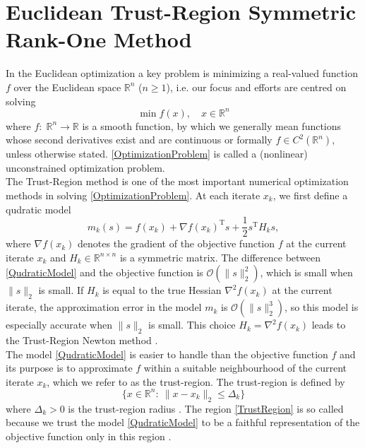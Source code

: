 \chapter{Euclidean Trust-Region Symmetric Rank-One Method}

In the Euclidean optimization a key problem is minimizing a real-valued function $f$ over the Euclidean space $\mathbb{R}^n$ ($n \geq 1$), i.e. our focus and efforts are centred on solving 
\begin{equation}\label{OptimizationProblem}
    \min f(x), \quad x \in \mathbb{R}^n
\end{equation}  
where $f \colon \; \mathbb{R}^n \to \mathbb{R}$ is a smooth function, by which we generally mean functions whose second derivatives exist and are continuous or formally $f \in C^2(\mathbb{R}^n)$, unless otherwise stated. \cref{OptimizationProblem} is called a (nonlinear) unconstrained optimization problem. \\
The Trust-Region method is one of the most important numerical optimization methods in solving \cref{OptimizationProblem}. At each iterate $x_k$, we first define a qudratic model 
\begin{equation}\label{QudraticModel}
    m_k(s) = f(x_k) + \nabla f(x_k)^{\mathrm{T}} s + \frac{1}{2} s^{\mathrm{T}} H_k s,
\end{equation}
where $\nabla f(x_k)$ denotes the gradient of the objective function $f$ at the current iterate $x_k$ and $H_k \in  \mathbb{R}^{n \times n}$ is a symmetric matrix. The difference between \cref{QudraticModel} and the objective function is $\mathcal{O}(\lVert s \rVert^{2}_2)$, which is small when $\lVert s \rVert_2$ is small. If $H_k$ is equal to the true Hessian $\nabla^2 f(x_k)$ at the current iterate, the approximation error in the model $m_k$ is $\mathcal{O}(\lVert s \rVert^{3}_2)$, so this model is especially accurate when $\lVert s \rVert_2$ is small. This choice $H_k = \nabla^2 f(x_k)$ leads to the Trust-Region Newton method \cite[p.~68]{NocedalWright:2006}. \\
The model \cref{QudraticModel} is easier to handle than the objective function $f$ and its purpose is to approximate $f$ within a suitable neighbourhood of the current iterate $x_k$, which we refer to as the trust-region. The trust-region is defined by
\begin{equation}\label{TrustRegion}
    \{ x \in \mathbb{R}^n \colon \ \lVert x - x_k \rVert_2 \leq \Delta_k \}
\end{equation}
where $\Delta_k > 0$ is the trust-region radius \cite[p.~115]{ConnGouldToint:2000}. The region \cref{TrustRegion} is so called because we trust the model \cref{QudraticModel} to be a faithful representation of the objective function only in this region \cite[p.~2]{ConnGouldToint:2000}. \\
